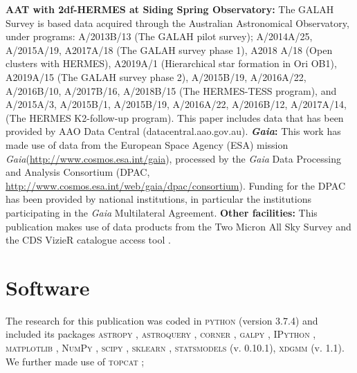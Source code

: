 \documentclass[
  journal=pasa,
  manuscript=research-paper, %
  year=2021,
  volume=37,
]{cup-journal}
\newcommand{\Gaia}{\textit{Gaia}\xspace}
\begin{document}
\textbf{AAT with 2df-HERMES at Siding Spring Observatory:}
The GALAH Survey is based data acquired through the Australian Astronomical Observatory, under programs: A/2013B/13 (The GALAH pilot survey); A/2014A/25, A/2015A/19, A2017A/18 (The GALAH survey phase 1), A2018 A/18 (Open clusters with HERMES), A2019A/1 (Hierarchical star formation in Ori OB1), A2019A/15 (The GALAH survey phase 2), A/2015B/19, A/2016A/22, A/2016B/10, A/2017B/16, A/2018B/15 (The HERMES-TESS program), and A/2015A/3, A/2015B/1, A/2015B/19, A/2016A/22, A/2016B/12, A/2017A/14, (The HERMES K2-follow-up program). This paper includes data that has been provided by AAO Data Central (datacentral.aao.gov.au).
\textbf{\Gaia: } This work has made use of data from the European Space Agency (ESA) mission \Gaia (\url{http://www.cosmos.esa.int/gaia}), processed by the \Gaia Data Processing and Analysis Consortium (DPAC, \url{http://www.cosmos.esa.int/web/gaia/dpac/consortium}). Funding for the DPAC has been provided by national institutions, in particular the institutions participating in the \Gaia Multilateral Agreement. 
\textbf{Other facilities:} This publication makes use of data products from the Two Micron All Sky Survey \citep{Skrutskie2006} and the CDS VizieR catalogue access tool \citep{Vizier2000}.

\section*{Software}

The research for this publication was coded in \textsc{python} (version 3.7.4) and included its packages
\textsc{astropy} \citep[v. 3.2.2;][]{Robitaille2013,PriceWhelan2018},
\textsc{astroquery} \citep[v. 0.4;][]{Ginsburg2019},
\textsc{corner} \citep[v. 2.0.1;][]{corner},
\textsc{galpy} \citep[version 1.6.0;][]{Bovy2015},
\textsc{IPython} \citep[v. 7.8.0;][]{ipython},
\textsc{matplotlib} \citep[v. 3.1.3;][]{matplotlib},
\textsc{NumPy} \citep[v. 1.17.2;][]{numpy},
\textsc{scipy} \citep[version 1.3.1;][]{scipy},
\textsc{sklearn} \citep[v. 0.21.3;][]{scikit-learn},
\textsc{statsmodels} (v. 0.10.1),
\textsc{xdgmm} (v. 1.1).
We further made use of \textsc{topcat} \citep[version 4.7;][]{Taylor2005};
\end{document}
